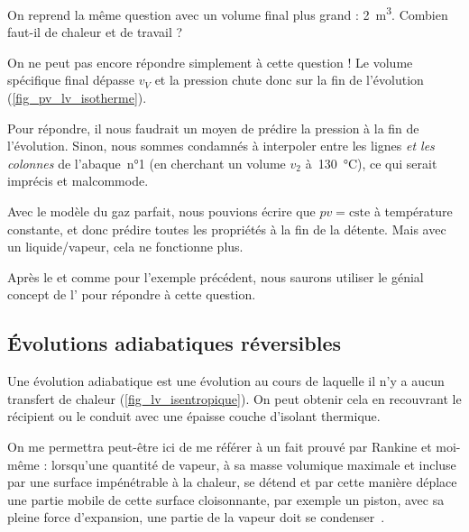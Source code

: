 			
			\begin{anexample}
			
			On reprend la même question avec un volume final plus grand : \SI{2}{\metre\cubed}. Combien faut-il de chaleur et de travail ?
					
				\begin{answer}
				On ne peut pas encore répondre simplement à cette question ! Le volume spécifique final dépasse $v_V$ et la pression chute donc sur la fin de l’évolution (\cref{fig_pv_lv_isotherme}).
				
				Pour répondre, il nous faudrait un moyen de prédire la pression à la fin de l’évolution. Sinon, nous sommes condamnés à interpoler entre les lignes \emph{et les colonnes} de l’abaque~n°1 (en cherchant un volume $v_2$ à~\SI{130}{\degreeCelsius}), ce qui serait imprécis et malcommode.
				
				\begin{remark}Avec le modèle du gaz parfait, nous pouvions écrire que $p v = \text{cste}$ à température constante, et donc prédire toutes les propriétés à la fin de la détente. Mais avec un liquide/vapeur, cela ne fonctionne plus.\end{remark}
				\begin{remark}Après le \courshuitshort et comme pour l’exemple précédent, nous saurons utiliser le génial concept de l’ pour répondre à cette question.\end{remark}\end{answer}
			\end{anexample}




	\subsection{Évolutions adiabatiques réversibles}
		\label{ch_lv_isentropiques}

		Une évolution adiabatique est une évolution au cours de laquelle il n’y a aucun transfert de chaleur (\cref{fig_lv_isentropique}). On peut obtenir cela en recouvrant le récipient ou le conduit avec une épaisse couche d’isolant thermique.
		
		On me permettra peut-être ici de me référer à un fait prouvé par Rankine et moi-même : lorsqu’une quantité de vapeur, à sa masse volumique maximale et incluse par une surface impénétrable à la chaleur, se détend et par cette manière déplace une partie mobile de cette surface cloisonnante, par exemple un piston, avec sa pleine force d’expansion, une partie de la vapeur doit se condenser~\jecourte.
		
